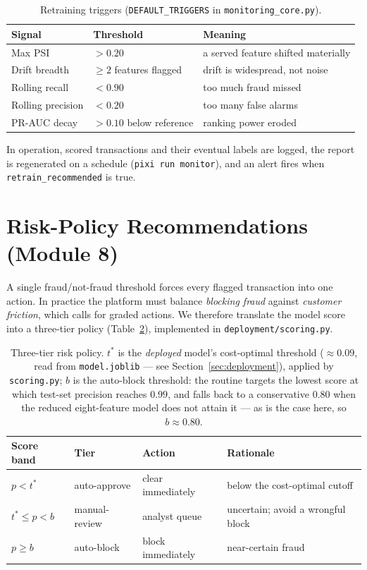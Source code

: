 \documentclass{article}
\begin{document}
\begin{table}[H]\centering
\begin{tabular}{lll}
\toprule
Signal & Threshold & Meaning \\
\midrule
Max PSI & $> 0.20$ & a served feature shifted materially \\
Drift breadth & $\ge 2$ features flagged & drift is widespread, not noise \\
Rolling recall & $< 0.90$ & too much fraud missed \\
Rolling precision & $< 0.20$ & too many false alarms \\
PR-AUC decay & $> 0.10$ below reference & ranking power eroded \\
\bottomrule
\end{tabular}
\caption{Retraining triggers (\texttt{DEFAULT\_TRIGGERS} in
\texttt{monitoring\_core.py}).}
\label{tab:triggers}
\end{table}

In operation, scored transactions and their eventual labels are logged, the
report is regenerated on a schedule (\texttt{pixi run monitor}), and an alert
fires when \texttt{retrain\_recommended} is true.

\section{Risk-Policy Recommendations (Module 8)}
\label{sec:riskpolicy}

A single fraud/not-fraud threshold forces every flagged transaction into one
action. In practice the platform must balance \emph{blocking fraud} against
\emph{customer friction}, which calls for graded actions. We therefore
translate the model score into a three-tier policy
(Table~\ref{tab:riskpolicy}), implemented in \texttt{deployment/scoring.py}.

\begin{table}[H]\centering
\begin{tabular}{p{2.4cm}p{2.2cm}p{3.0cm}p{4.6cm}}
\toprule
Score band & Tier & Action & Rationale \\
\midrule
$p < t^{*}$ & auto-approve & clear immediately & below the cost-optimal cutoff \\
$t^{*} \le p < b$ & manual-review & analyst queue & uncertain; avoid a wrongful block \\
$p \ge b$ & auto-block & block immediately & near-certain fraud \\
\bottomrule
\end{tabular}
\caption{Three-tier risk policy. $t^{*}$ is the \emph{deployed} model's
cost-optimal threshold ($\approx 0.09$, read from \texttt{model.joblib} --- see
Section~\ref{sec:deployment}), applied by \texttt{scoring.py}; $b$ is the
auto-block threshold: the routine targets the lowest score at which test-set
precision reaches $0.99$, and falls back to a conservative $0.80$ when the reduced
eight-feature model does not attain it --- as is the case here, so $b \approx 0.80$.}
\label{tab:riskpolicy}
\end{table}
\end{document}
